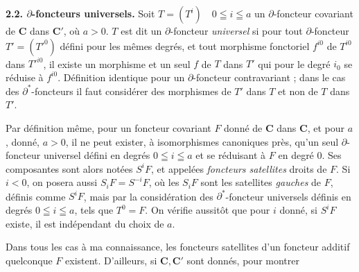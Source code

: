 \indent\textbf{2.2. $\partial$-foncteurs universels.}
Soit $T=(T^i)\quad 0\leqq i\leqq a$ un $\partial$-foncteur covariant de $\mathbf{C}$ dans
$\mathbf{C}'$, où $a>0$. $T$ est dit un $\partial$-foncteur \textit{universel} si pour
tout $\partial$-foncteur $T'=(T'^0)$ défini pour les mêmes degrés, et tout
morphisme fonctoriel $f^{i0}$ de $T^{i0}$ dans $T'^{i0}$, il existe un
morphisme et un seul $f$ de $T$ dans $T'$ qui pour le degré $i_0$ se réduise à
$f^{i0}$. Définition identique pour un $\partial$-foncteur contravariant ;
dans le cas des $\partial^*$-foncteurs il faut considérer des morphismes de
$T'$ dans $T$ et non de $T$ dans $T'$.

Par définition même, pour un foncteur covariant $F$ donné de $\mathbf{C}$ dans $\mathbf{C}$, et
pour $a$, donné, $a>0$, il ne peut exister, à isomorphismes canoniques près,
qu'un seul $\partial$-foncteur universel défini en degrés $0\leqq i\leqq a$ et
se réduisant à $F$ en degré 0.
Ses composantes sont alors notées $S^iF$, et appelées \textit{foncteurs
satellites} droits de $F$. Si $i<0$, on posera aussi $S_iF=S^{-i}F$, où les
$S_iF$ sont les satellites \textit{gauches} de $F$, définis comme $S^iF$,
mais par la considération des $\partial^*$-foncteur universels définis en
degrés $0\leqq i\leqq a$, tels que $T^0=F$. On vérifie aussitôt que pour $i$
donné, si $S^iF$ existe, il est indépendant du choix de $a$.

Dans tous les cas à ma connaissance, les foncteurs satellites d'un foncteur
additif quelconque $F$ existent. D'ailleurs, si $\mathbf{C},\mathbf{C}'$ sont donnés, pour
montrer


